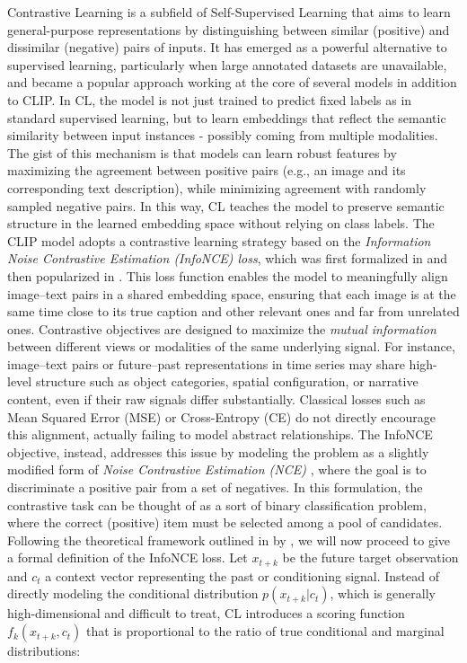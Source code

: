 \documentclass[a4paper, oneside, english]{sapthesis} %
\begin{document}
Contrastive Learning is a subfield of Self-Supervised Learning that aims to learn general-purpose representations by distinguishing between similar (positive) and dissimilar (negative) pairs of inputs. It has emerged as a powerful alternative to supervised learning, particularly when large annotated datasets are unavailable, and became a popular approach working at the core of several models in addition to CLIP. In CL, the model is not just trained to predict fixed labels as in standard supervised learning, but to learn embeddings that reflect the semantic similarity between input instances - possibly coming from multiple modalities.
The gist of this mechanism is that models can learn robust features by maximizing the agreement between positive pairs (e.g., an image and its corresponding text description), while minimizing agreement with randomly sampled negative pairs. In this way, CL teaches the model to preserve semantic structure in the learned embedding space without relying on class labels. 
The CLIP model adopts a contrastive learning strategy based on the \emph{Information Noise Contrastive Estimation (InfoNCE) loss}, which was first formalized in \cite{sohn2016improved} and then popularized in \cite{oord2018representation}. This loss function enables the model to meaningfully align image–text pairs in a shared embedding space, ensuring that each image is at the same time close to its true caption and other relevant ones and far from unrelated ones.
Contrastive objectives are designed to maximize the \emph{mutual information} between different views or modalities of the same underlying signal. For instance, image–text pairs or future–past representations in time series may share high-level structure such as object categories, spatial configuration, or narrative content, even if their raw signals differ substantially. Classical losses such as Mean Squared Error (MSE) or Cross-Entropy (CE) do not directly encourage this alignment, actually failing to model abstract relationships.
The InfoNCE objective, instead, addresses this issue by modeling the problem as a slightly modified form of \emph{Noise Contrastive Estimation (NCE)} \cite{gutmann2010noise} \cite{mnih2012fast} \cite{jozefowicz2016exploring}, where the goal is to discriminate a positive pair from a set of negatives. In this formulation, the contrastive task can be thought of as a sort of binary classification problem, where the correct (positive) item must be selected among a pool of candidates.
Following the theoretical framework outlined in by \cite{oord2018representation}, we will now proceed to give a formal definition of the InfoNCE loss. Let $x_{t+k}$ be the future target observation and $c_t$ a context vector representing the past or conditioning signal. Instead of directly modeling the conditional distribution $p(x_{t+k} | c_t)$, which is generally high-dimensional and difficult to treat, CL introduces a scoring function $f_k(x_{t+k}, c_t)$ that is proportional to the ratio of true conditional and marginal distributions:
\end{document}
